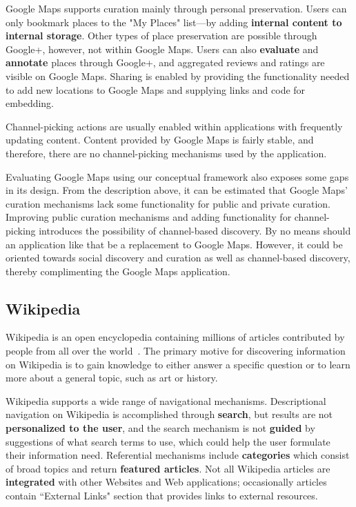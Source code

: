 \documentclass{sigchi}
\begin{document}
{{Google Maps supports curation mainly through personal preservation. Users can only bookmark places to the "My Places" list---by adding \textbf{internal content to internal storage}. Other types of place preservation are possible through Google+, however, not within Google Maps. Users can also \textbf{evaluate} and \textbf{annotate} places through Google+, and aggregated reviews and ratings are visible on Google Maps. Sharing is enabled by providing the functionality needed to add new locations to Google Maps and supplying links and code for embedding.  

Channel-picking actions are usually enabled within applications with frequently updating content. Content provided by Google Maps is fairly stable, and therefore, there are no channel-picking mechanisms used by the application.

Evaluating Google Maps using our conceptual framework also exposes some gaps in its design. From the description above, it can be estimated that Google Maps' curation mechanisms lack some functionality for public and private curation. Improving public curation mechanisms and adding functionality for channel-picking introduces the possibility of channel-based discovery. By no means should an application like that be a replacement to Google Maps. However, it could be oriented towards social discovery and curation as well as channel-based discovery, thereby complimenting the Google Maps application.  

} %

{\subsection{Wikipedia}
Wikipedia is an open encyclopedia containing millions of articles contributed by people from all over the world~\cite{kittur2007power,volkel2006semantic}. The primary motive for discovering information on Wikipedia is to gain knowledge to either answer a specific question or to learn more about a general topic, such as art or history.



Wikipedia supports a wide range of navigational mechanisms. Descriptional navigation on Wikipedia is accomplished through \textbf{search}, but results are not \textbf{personalized to the user}, and the search mechanism is not \textbf{guided} by suggestions of what search terms to use, which could help the user formulate their information need. Referential mechanisms include \textbf{categories} which consist of broad topics and return \textbf{featured articles}. Not all Wikipedia articles are \textbf{integrated} with other Websites and Web applications; occasionally articles contain ``External Links" section that provides links to external resources. 

}}
\end{document}
